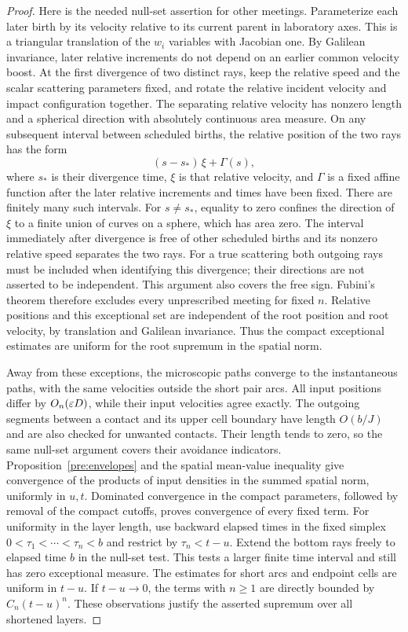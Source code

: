 \begin{proof}
Here is the needed null-set assertion for other meetings. Parameterize
each later birth by its velocity relative to its current parent in
laboratory axes. This is a triangular translation of the $w_i$
variables with Jacobian one. By Galilean invariance, later relative
increments do not depend on an earlier common velocity boost.
At the first divergence of two distinct rays, keep the relative
speed and the scalar scattering parameters fixed, and rotate the
relative incident velocity and impact configuration together.
The separating relative velocity has nonzero length and a spherical
direction with absolutely continuous area measure. On any subsequent
interval between scheduled births, the relative position of the two
rays has the form
\begin{equation}\label{cent:meeting-null}
 (s-s_*)\,\xi+\Gamma(s),
\end{equation}
where $s_*$ is their divergence time, $\xi$ is that relative velocity,
and $\Gamma$ is a fixed affine function after the later relative
increments and times have been fixed. There are finitely many such
intervals. For $s\ne s_*$, equality to zero confines the direction of
$\xi$ to a finite union of curves on a sphere, which has area zero.
The interval immediately after divergence is free of other scheduled
births and its nonzero relative speed separates the two rays.
For a true scattering both outgoing rays must be included when
identifying this divergence; their directions are not asserted to be
independent. This argument also covers the free sign. Fubini's theorem
therefore excludes every unprescribed meeting for fixed $n$. Relative
positions and this exceptional set are independent of the root
position and root velocity, by translation and Galilean invariance.
Thus the compact exceptional estimates are uniform for the root
supremum in the spatial norm.

Away from these exceptions, the microscopic paths converge to the
instantaneous paths, with the same velocities outside the short pair
arcs. All input positions differ by $O_n(\varepsilon D)$, while their input
velocities agree exactly. The outgoing segments between a contact
and its upper cell boundary have length $O(b/J)$ and are also checked
for unwanted contacts. Their length tends to zero, so the same
null-set argument covers their avoidance indicators. Proposition~\ref{pre:envelopes} and the
spatial mean-value inequality give convergence of the products of
input densities in the summed spatial norm, uniformly in $u,t$.
Dominated convergence in the compact parameters, followed by removal
of the compact cutoffs, proves convergence of every fixed term.
For uniformity in the layer length, use backward elapsed times in the
fixed simplex $0<\tau_1<\cdots<\tau_n<b$ and restrict by
$\tau_n<t-u$. Extend the bottom rays freely to elapsed time $b$ in
the null-set test. This tests a larger finite time interval and still
has zero exceptional measure. The estimates for short arcs and
endpoint cells are uniform in $t-u$. If $t-u\to0$, the terms with
$n\geq1$ are directly bounded by $C_n(t-u)^n$. These observations
justify the asserted supremum over all shortened layers.


\end{proof}
